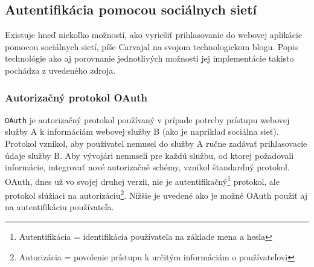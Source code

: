 \documentclass[12pt,oneside]{fithesis2}
\begin{document}
      		\subsection{Autentifikácia pomocou sociálnych sietí} \label{soc-auth}
      		\par Existuje hneď niekoľko možností, ako vyriešiť prihlasovanie do webovej aplikácie pomocou sociálnych sietí, píše Carvajal\cite{carvajal14} na svojom technologickom blogu. Popis technológie ako aj porovnanie jednotlivých možností jej implementácie takisto pochádza z uvedeného zdroja.
      		
      		\subsubsection{Autorizačný protokol OAuth}
      		\par \texttt{OAuth} je autorizačný protokol používaný v prípade potreby prístupu webovej služby A k informáciám webovej služby B (ako je napríklad sociálna sieť). Protokol vznikol, aby používateľ nemusel do služby A ručne zadávať prihlasovacie údaje  služby B. Aby vývojári nemuseli pre každú službu, od ktorej požadovali informácie, integrovať nové autorizačné schémy, vznikol štandardný protokol. OAuth, dnes už vo svojej druhej verzii, nie je autentifikačný\footnote{Autentifikácia = identifikácia používateľa na základe mena a hesla} protokol, ale protokol slúžiaci na autorizáciu\footnote{Autorizácia = povolenie prístupu k určitým informáciám o používateľovi}. Nižšie je uvedené ako je možné OAuth použiť aj na autentifikáciu používateľa.
      		
\end{document}
